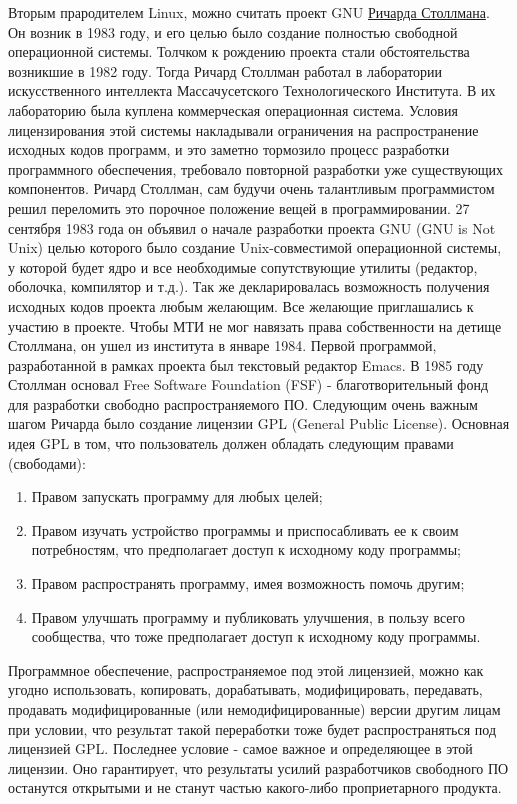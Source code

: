 \documentclass[bachelor, och, referat, times]{SCWorks}
\begin{document}
\par Вторым прародителем Linux, можно считать 
проект GNU 
\href{https://en.wikipedia.org/wiki/Richard_Stallman}{Ричарда 
Столлмана}. Он возник в 1983 году, и его целью было 
создание полностью 
свободной операционной системы. Толчком к рождению 
проекта стали 
обстоятельства возникшие в 1982 году. Тогда Ричард 
Столлман работал в 
лаборатории искусственного интеллекта 
Массачусетского Технологического 
Института. В их лабораторию была куплена 
коммерческая операционная 
система. Условия лицензирования этой системы 
накладывали ограничения на 
распространение исходных кодов программ, и это 
заметно тормозило процесс 
разработки программного обеспечения, требовало 
повторной разработки уже 
существующих компонентов. Ричард Столлман, сам 
будучи очень талантливым 
программистом решил переломить это порочное 
положение вещей в 
программировании. 27 сентября 1983 года он объявил 
о начале разработки 
проекта GNU (GNU is Not Unix) целью которого было 
создание 
Unix-совместимой операционной системы, у которой 
будет ядро и все 
необходимые сопутствующие утилиты (редактор, 
оболочка, компилятор и т.д.).
Так же декларировалась возможность получения 
исходных кодов проекта любым 
желающим. Все желающие приглашались к участию в 
проекте. Чтобы МТИ не мог 
навязать права собственности на детище Столлмана, 
он ушел из института в 
январе 1984. Первой программой, разработанной в 
рамках проекта был 
текстовый редактор Emacs. В 1985 году Столлман 
основал Free Software 
Foundation (FSF) - благотворительный фонд для 
разработки свободно 
распространяемого ПО. Следующим очень важным шагом 
Ричарда было создание 
лицензии GPL (General Public License). Основная 
идея GPL в том, что 
пользователь должен обладать следующим правами 
(свободами):
	\begin{enumerate}
		\item Правом запускать программу для любых 
		целей;
		\item Правом изучать устройство программы и 
		приспосабливать ее к 
		своим потребностям, что предполагает доступ 
		к исходному коду 
		программы;
		\item Правом распространять программу, имея 
		возможность помочь 
		другим;
		\item Правом улучшать программу и 
		публиковать улучшения, в пользу 
		всего сообщества, что тоже предполагает 
		доступ к исходному коду 
		программы.
	\end{enumerate}
	
\par Программное обеспечение, распространяемое под 
этой лицензией, можно 
как угодно использовать, копировать, дорабатывать, 
модифицировать, 
передавать, продавать модифицированные (или 
немодифицированные) версии 
другим лицам при условии, что результат такой 
переработки тоже будет 
распространяться под лицензией GPL. Последнее 
условие - самое важное и 
определяющее в этой лицензии. Оно гарантирует, что 
результаты усилий 
разработчиков свободного ПО останутся открытыми и 
не станут частью 
какого-либо проприетарного продукта.
\end{document}
